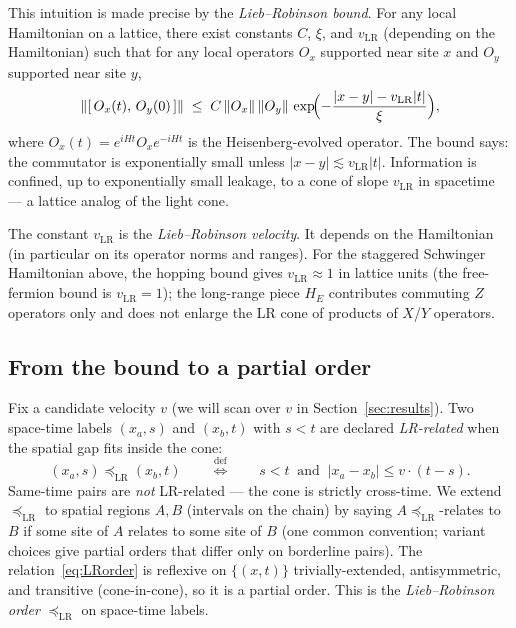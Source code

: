 \documentclass[11pt,a4paper]{article}
\theoremstyle{definition}
\theoremstyle{plain}
\theoremstyle{remark}
\newcommand{\norm}[1]{\lVert #1 \rVert}
\newcommand{\abs}[1]{\lvert #1 \rvert}
\newcommand{\LR}{\mathrm{LR}}
\begin{document}
This intuition is made precise by the \emph{Lieb--Robinson bound}.
For any local Hamiltonian on a lattice, there exist constants $C$,
$\xi$, and $v_{\LR}$ (depending on the Hamiltonian) such that for any
local operators $O_x$ supported near site $x$ and $O_y$ supported
near site $y$,
\begin{equation}\label{eq:LR}
  \norm{[\,O_x(t),\, O_y(0)\,]}
  \;\le\;
  C\, \norm{O_x}\, \norm{O_y}\,
  \exp\!\Bigl(-\frac{\abs{x - y} - v_{\LR} \abs{t}}{\xi}\Bigr),
\end{equation}
where $O_x(t) = e^{iHt} O_x e^{-iHt}$ is the Heisenberg-evolved
operator.  The bound says: the commutator is exponentially small
unless $\abs{x - y} \lesssim v_{\LR} \abs{t}$.  Information is
confined, up to exponentially small leakage, to a cone of slope
$v_{\LR}$ in spacetime --- a lattice analog of the light cone.

The constant $v_{\LR}$ is the \emph{Lieb--Robinson velocity}.  It
depends on the Hamiltonian (in particular on its operator norms and
ranges).  For the staggered Schwinger Hamiltonian above, the
hopping bound gives $v_{\LR} \approx 1$ in lattice units (the
free-fermion bound is $v_{\LR} = 1$); the long-range piece $H_E$
contributes commuting $Z$ operators only and does not enlarge the
LR cone of products of $X$/$Y$ operators.

\subsection{From the bound to a partial order}

Fix a candidate velocity $v$ (we will scan over $v$ in
Section~\ref{sec:results}).  Two space-time labels $(x_a, s)$ and
$(x_b, t)$ with $s < t$ are declared
\emph{LR-related} when the spatial gap fits inside the cone:
\begin{equation}\label{eq:LRorder}
  (x_a, s) \preceq_{\LR} (x_b, t) \qquad \stackrel{\text{def}}{\iff} \qquad
  s < t \;\;\text{and}\;\; \abs{x_a - x_b} \le v \cdot (t - s).
\end{equation}
Same-time pairs are \emph{not} LR-related --- the cone is strictly
cross-time.  We extend $\preceq_{\LR}$ to spatial regions $A, B$
(intervals on the chain) by saying $A \preceq_{\LR}$-relates to $B$ if
some site of $A$ relates to some site of $B$ (one common convention;
variant choices give partial orders that differ only on borderline
pairs).
The relation~\eqref{eq:LRorder} is reflexive on $\{(x,t)\}$
trivially-extended, antisymmetric, and transitive (cone-in-cone), so
it is a partial order.  This is the \emph{Lieb--Robinson order}
$\preceq_{\LR}$ on space-time labels.
\end{document}
